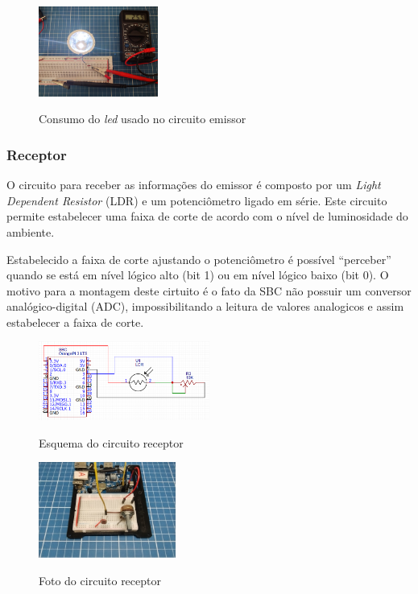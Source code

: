 \begin{figure}[!htbp]
  \caption{Consumo do \textit{led} usado no circuito emissor}
  \includegraphics[width=0.35\textwidth]{images/consumo_led.jpg}
  \label{corrente_led}
\end{figure}


\subsubsection{Receptor}

O circuito para receber as informações do emissor é composto por um \textit{Light Dependent Resistor} (LDR) e um potenciômetro ligado em série. Este circuito permite estabelecer uma faixa de corte de acordo com o nível de luminosidade do ambiente.

Estabelecido a faixa de corte ajustando o potenciômetro é possível ``perceber” quando se está em nível lógico alto (bit 1) ou em nível lógico baixo (bit 0). O motivo para a montagem deste cirtuito é o fato da SBC não possuir um conversor analógico-digital (ADC), impossibilitando a leitura de valores analogicos e assim estabelecer a faixa de corte.


\begin{figure}[!htbp]
  \caption{Esquema do circuito receptor}
  \includegraphics[width=0.5\textwidth]{images/esquema_circuito_receptor.png}
  \label{esquema-circuito-receptor}
\end{figure}


\begin{figure}[!htbp]
  \caption{Foto do circuito receptor}
  \includegraphics[width=0.4\textwidth]{images/foto_circuito_receptor.jpg}
  \label{foto-circuito-receptor}
\end{figure}

